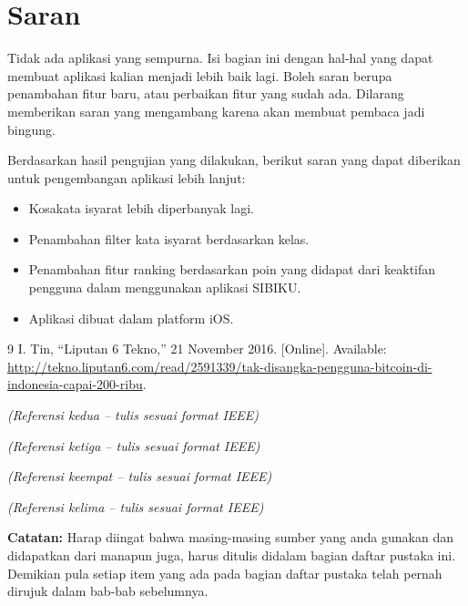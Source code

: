 \documentclass[a4paper,11pt,oneside]{report}
\begin{document}
\section{Saran}
Tidak ada aplikasi yang sempurna. Isi bagian ini dengan hal-hal yang dapat
membuat aplikasi kalian menjadi lebih baik lagi. Boleh saran berupa penambahan
fitur baru, atau perbaikan fitur yang sudah ada. Dilarang memberikan saran yang
mengambang karena akan membuat pembaca jadi bingung.

Berdasarkan hasil pengujian yang dilakukan, berikut saran yang dapat diberikan
untuk pengembangan aplikasi lebih lanjut:
\begin{itemize}
    \item Kosakata isyarat lebih diperbanyak lagi.
    \item Penambahan filter kata isyarat berdasarkan kelas.
    \item Penambahan fitur ranking berdasarkan poin yang didapat dari keaktifan
    pengguna dalam menggunakan aplikasi SIBIKU.
    \item Aplikasi dibuat dalam platform iOS.
\end{itemize}

\renewcommand{\bibname}{Daftar Pustaka}
\begin{thebibliography}{9}
I. Tin, ``Liputan 6 Tekno,'' 21 November 2016. [Online]. Available:
\url{http://tekno.liputan6.com/read/2591339/tak-disangka-pengguna-bitcoin-di-indonesia-capai-200-ribu}.

\textit{(Referensi kedua -- tulis sesuai format IEEE)}

\textit{(Referensi ketiga -- tulis sesuai format IEEE)}

\textit{(Referensi keempat -- tulis sesuai format IEEE)}

\textit{(Referensi kelima -- tulis sesuai format IEEE)}
\end{thebibliography}

\noindent\textbf{Catatan:} Harap diingat bahwa masing-masing sumber yang anda
gunakan dan didapatkan dari manapun juga, harus ditulis didalam bagian daftar
pustaka ini. Demikian pula setiap item yang ada pada bagian daftar pustaka telah
pernah dirujuk dalam bab-bab sebelumnya.

\appendix
\end{document}
